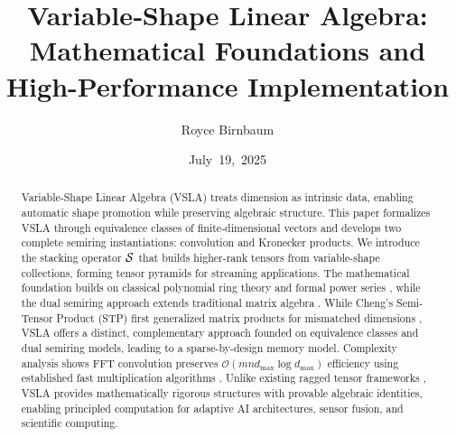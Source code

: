\documentclass[11pt]{article}
\title{Variable‑Shape Linear Algebra: Mathematical Foundations and High-Performance Implementation}
\author{Royce Birnbaum}
\date{July 19, 2025}
\begin{document}
\maketitle

\begin{abstract}
Variable‑Shape Linear Algebra (VSLA) treats dimension as intrinsic data, enabling automatic shape promotion while preserving algebraic structure. This paper formalizes VSLA through equivalence classes of finite‑dimensional vectors and develops two complete semiring instantiations: convolution and Kronecker products. We introduce the stacking operator $\mathcal{S}$ that builds higher-rank tensors from variable-shape collections, forming tensor pyramids for streaming applications. The mathematical foundation builds on classical polynomial ring theory and formal power series \cite{VonZurGathenGerhard2013}, while the dual semiring approach extends traditional matrix algebra \cite{HornJohnson2012,GondranMinoux2008}. While Cheng's Semi-Tensor Product (STP) first generalized matrix products for mismatched dimensions \cite{Cheng2001}, VSLA offers a distinct, complementary approach founded on equivalence classes and dual semiring models, leading to a sparse-by-design memory model. Complexity analysis shows FFT convolution preserves $\mathcal{O}(mn d_{\max} \log d_{\max})$ efficiency using established fast multiplication algorithms \cite{CooleyTukey1965}. Unlike existing ragged tensor frameworks \cite{TF2024,PyTorch2023,NestedTensorPyTorch2022}, VSLA provides mathematically rigorous structures with provable algebraic identities, enabling principled computation for adaptive AI architectures, sensor fusion, and scientific computing.
\end{abstract}

\vspace{0.5em}
\noindent{}

\vspace{1em}
\noindent{}



















\end{document}
